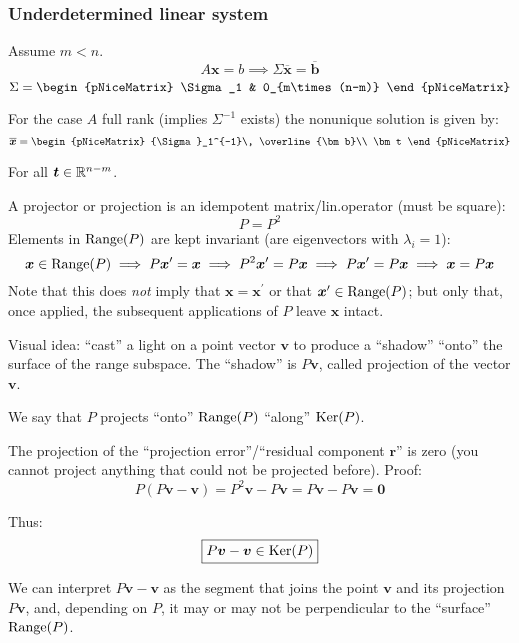 \documentclass[
  12pt,
  paper=a4,
]{scrartcl} %
\begin{document}
\subsubsection*{Underdetermined linear system}

Assume $m<n$.
\[
A\bm x = b
 \implies
  \Sigma \overline{\bm x}
  = \overline{\bm b}
\]
\[
\Sigma=\begin{pNiceMatrix}
    \Sigma_1 & 0_{m\times (n-m)}
\end{pNiceMatrix}
\]

For the case $A$ full rank (implies $\Sigma^{-1}$ exists) the nonunique solution is given by:
\[
\overline{\bm x} = \begin{pNiceMatrix}
    {\Sigma}_1^{-1}\, \overline{\bm b}\\ \bm t
\end{pNiceMatrix}
\]

For all $\bm t \in \mathbb R^{n-m}$.

\newpage
{}

A projector or projection is an idempotent matrix/lin.\@ operator
(must be square):
\[
    P = P^2
\]
Elements in $\operatorname{Range}(P)$ are kept invariant (are eigenvectors with $\lambda_i=1$):
\[
    \bm x\in\operatorname{Range}(P) \implies
    P \bm x^\prime = \bm x \implies
    P^2 \bm x^\prime = P \bm x \implies
    P \bm x^\prime = P \bm x \implies
    \bm x = P \bm x
\]
Note that this does \emph{not} imply that $\bm x = \bm x^\prime$ or that $\bm x^\prime\in \operatorname{Range}(P)$; but only that, once applied, the subsequent applications of $P$ leave $\bm x$ intact.

Visual idea: ``cast'' a light on a point vector $\bm v$ to produce a ``shadow'' ``onto'' the surface of the range subspace. The ``shadow'' is $P\bm v$, called projection of the vector $\bm v$.

We say that $P$ projects ``onto'' $\operatorname{Range}(P)$ ``along'' $\operatorname{Ker}(P)$.

The projection of the ``projection error''/``residual component $\bm r$'' is zero (you cannot project anything that could not be projected before). Proof:
\[
    P(P\bm v -\bm v) = P^2 \bm v - P\bm v = P\bm v - P\bm v = \bm 0
\]

Thus: \[\boxed{P\bm v - \bm v \in \operatorname{Ker}(P)}\]

We can interpret $P\bm v - \bm v$ as the segment that joins the point $\bm v$ and its projection $P \bm v$, and, depending on $P$, it may or may not be perpendicular to the ``surface'' $\operatorname{Range}(P)$. %
\end{document}
